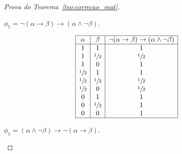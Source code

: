 \begin{proof}[Prova do Teorema~\ref{teo:correcao_mat}]
\begin{provaporcasos}
\begin{provaporsubcasos}
                \subcasodeprova{} $\phi_{1} = \neg (\alpha \to \beta) \to(\alpha \land \neg \beta)$. 

                \begin{center}
                    \[
                        \begin{array}{|c|c|c|}%
                            \hline
                            \alpha      & \beta & \neg (\alpha \to \beta) \to(\alpha \land \neg \beta) \\
                            \hline%
                            1 & 1 & 1\\
                            1 & \meio{} & \meio{}\\
                            1 & 0 & 1\\
                            \meio{} & 1 & 1\\
                            \meio{} & \meio{} &\meio{}\\ 
                            \meio{} & 0 & \meio{}\\
                            0 & 1 & 1\\
                            0 & \meio{} & 1\\
                            0 & 0 & 1\\
                            \hline
                        \end{array}
                    \]
                \end{center}
               

                \subcasodeprova{} $\phi_{1} = (\alpha \land \neg \beta) \to \neg(\alpha \to \beta)$.


\end{provaporsubcasos}
\end{provaporcasos}
\end{proof}
